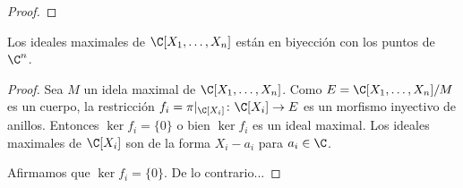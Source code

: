 \begin{proof}

\end{proof}

\begin{theorem}
Los ideales maximales de $\C[X_1,\dots,X_n]$ están en biyección con 
los puntos de $\C^n$.
\end{theorem}

\begin{proof}
Sea $M$ un idela maximal de $\C[X_1,\dots,X_n]$. Como $E=\C[X_1,\dots,X_n]/M$ es un cuerpo, la restricción
$f_i=\pi|_{\C[X_i]}\colon\C[X_i]\to E$ es un morfismo inyectivo de anillos. Entonces $\ker f_i=\{0\}$ o bien $\ker f_i$ es un ideal maximal. Los ideales 
maximales de $\C[X_i]$ son de la forma $X_i-a_i$ para $a_i\in\C$. 

Afirmamos que $\ker f_i=\{0\}$. De lo contrario...

\end{proof}